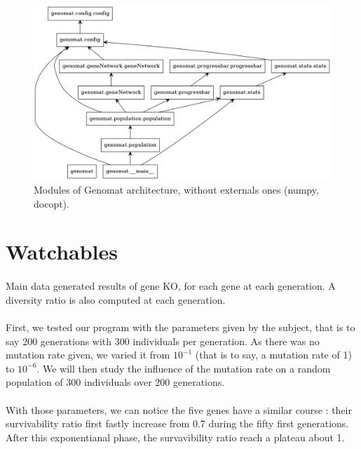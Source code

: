 \documentclass[]{report} %
\begin{document}
        \begin{figure}[H] 
                \centering
                \includegraphics[width=\textwidth]{packages_genomat.png}
                \caption{Modules of Genomat architecture, without externals ones (numpy, docopt).}
                \label{fig:umldiag}
        \end{figure}




\section{Watchables}
    \paragraph*{}
    Main data generated results of gene KO, for each gene at each generation. 
    A diversity ratio is also computed at each generation.
    \paragraph*{}
     First, we tested our program with the parameters given by the subject, that is to say 200 generations with 300 individuals per generation. 
     As there was no mutation rate given, we varied it from $10^{-1}$ (that is to say, a mutation rate of 1) to $10^{-6}$. 
     We will then study the influence of the mutation rate on a random population of 300 individuals over 200 generations.
    \paragraph*{}
     With those parameters, we can notice the five genes have a similar course : their survivability ratio first fastly 
     increase from 0.7 during the fifty first generations. After this exponentianal phase, the survavibility ratio reach a plateau about 1. 
\end{document}

